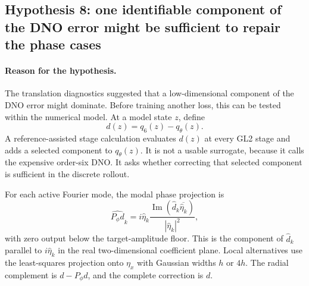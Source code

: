 \documentclass[11pt]{article}
\begin{document}
\subsection{Hypothesis 8: one identifiable component of the DNO error might be
sufficient to repair the phase cases}

\paragraph{Reason for the hypothesis.}
The translation diagnostics suggested that a low-dimensional component of the
DNO error might dominate.  Before training another loss, this can be tested
within the numerical model.  At a model state $z$, define
\begin{equation}
  d(z)=q_6(z)-q_\theta(z).
  \label{eq:defect}
\end{equation}
A reference-assisted stage calculation evaluates $d(z)$ at every GL2 stage
and adds a selected component to $q_\theta(z)$.  It is not a usable surrogate,
because it calls the expensive order-six DNO.  It asks whether correcting that
selected component is sufficient in the discrete rollout.

For each active Fourier mode, the modal phase projection is
\begin{equation}
  \widehat{P_\phi d}_k
  =i\widehat\eta_k
  \frac{\operatorname{Im}(\widehat d_k\overline{\widehat\eta_k})}
       {|\widehat\eta_k|^2},
  \label{eq:modal-projection}
\end{equation}
with zero output below the target-amplitude floor.  This is the component of
$\widehat d_k$ parallel to $i\widehat\eta_k$ in the real two-dimensional
coefficient plane.  Local alternatives use the least-squares projection onto
$\eta_x$ with Gaussian widths $h$ or $4h$.  The radial complement is
$d-P_\phi d$, and the complete correction is $d$.
\end{document}
